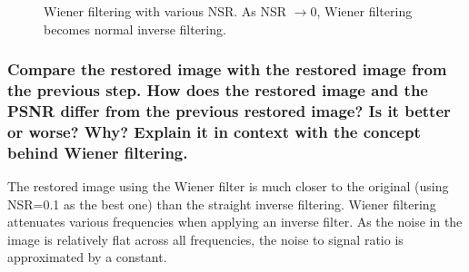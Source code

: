 \documentclass[article, 1.5space, letterpaper, 12pt, oneside, header, footer]{SydeClass}
\begin{document}
\begin{figure}[ht]
	\caption{Wiener filtering with various NSR. As NSR $\rightarrow$0, Wiener filtering becomes normal inverse filtering.}
\end{figure}


\subsubsection{Compare the restored image with the restored image from the previous step. How does the restored image and the PSNR differ from the previous restored image? Is it better or worse? Why? Explain it in context with the concept behind Wiener filtering.}

The restored image using the Wiener filter is much closer to the original (using NSR=0.1 as the best one) than the straight inverse filtering. Wiener filtering attenuates various frequencies when applying an inverse filter. As the noise in the image is relatively flat across all frequencies, the noise to signal ratio is approximated by a constant.
\end{document}
